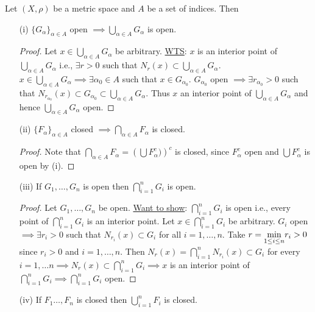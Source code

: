 \documentclass[]{article}
\begin{document}
\begin{theorem}
	Let $(X,\rho)$ be a metric space and $A$ be a set of indices. Then
	\begin{enumerate}
		\item[(i)] $\{G_\alpha\}_{\alpha\in A}$ open $\implies \bigcup_{\alpha\in A} G_\alpha$ is open.
			\begin{proof}
				Let $x\in \bigcup_{\alpha\in A} G_\alpha$ be arbitrary.
				\ul{WTS}: $x$ is an interior point of $\bigcup_{\alpha\in A} G_\alpha$ i.e., $\exists r>0$ such that $N_r(x)\subset \bigcup_{\alpha\in A} G_\alpha$.
				$x\in\bigcup_{\alpha\in A}G_\alpha \implies \exists \alpha_0\in A$ such that $x\in G_{\alpha_0}$.
				$G_{\alpha_0}$ open $\implies \exists r_{\alpha_0}>0$ such that $N_{r_{\alpha_0}}(x)\subset G_{\alpha_0} \subset \bigcup_{\alpha\in A} G_\alpha$.
				Thus $x$ an interior point of $\bigcup_{\alpha\in A} G_\alpha$ and hence $\bigcup_{\alpha\in A} G_\alpha$ open.
			\end{proof}
		\item[(ii)] $\{F_\alpha\}_{\alpha\in A}$ closed $\implies \bigcap_{\alpha\in A} F_\alpha$ is closed.
			\begin{proof}
				Note that $\bigcap_{\alpha\in A} F_\alpha = \left(\bigcup F_\alpha^c)\right)^c$ is closed, since $F_\alpha^c$ open and $\bigcup F_\alpha^c$ is open by (i).
			\end{proof}
		\item[(iii)] If $G_1,\dots,G_n$ is open then $\bigcap_{i=1}^n G_i$ is open.
			\begin{proof}
				Let $G_1,\dots,G_n$ be open.
				\ul{Want to show}: $\bigcap_{i=1}^n G_i$ is open i.e., every point of $\bigcap_{i=1}^n G_i$ is an interior point.
				Let $x\in\bigcap_{i=1}^n G_i$ be arbitrary. $G_i$ open $\implies\exists r_i>0$ such that $N_{r_i}(x)\subset G_i$ for all $i=1,\dots,n$.
				Take $r=\underset{1\leq i\leq n}{\min} r_i>0$ since $r_i>0$ and $i=1,\dots,n$.
				Then $N_r(x) = \bigcap_{i=1}^n N_{r_i}(x)\subset G_i$ for every $i=1,\dots n \implies N_r(x)\subset\bigcap_{i=1}^n G_i \implies x$ is an interior point of $\bigcap_{i=1}^n G_i \implies \bigcap_{i=1}^n G_i$ open.
			\end{proof}
		\item[(iv)] If $F_1\dots,F_n$ is closed then $\bigcup_{i=1}^n F_i$ is closed.
	\end{enumerate}
\end{theorem}
\end{document}
